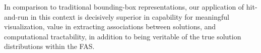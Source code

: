 In comparison to traditional bounding-box representations, our application of hit-and-run in this context is decisively superior in capability for meaningful visualization, value in extracting associations between solutions, and computational tractability, in addition to being veritable of the true solution distributions within the FAS.

